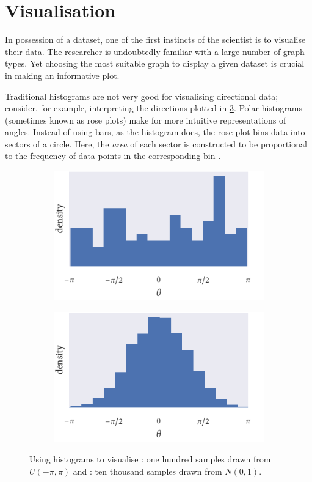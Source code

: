 \section{Visualisation}
\label{sec:circular_visualisation}

In possession of a dataset, one of the first instincts of the scientist is to visualise
their data. The researcher is undoubtedly familiar with a large number of graph types.
Yet choosing the most suitable graph to display a given dataset is crucial in making an
informative plot.

Traditional histograms are not very good for visualising directional data; consider, for
example, interpreting the directions plotted in \cref{fig:angle_hist}. Polar histograms
(sometimes known as rose plots) make for more intuitive representations of angles.
Instead of using bars, as the histogram does, the rose plot bins data into sectors of a
circle. Here, the \emph{area} of each sector is constructed to be proportional to the
frequency of data points in the corresponding bin \parencite{mardia09}.

\begin{figure}[tb]
	\begin{subfigure}[b]{0.5\textwidth}
		\includegraphics{unif_angle_hist.pdf}
		\caption{}
		\label{subfig:unif_angle_hist}
	\end{subfigure}%
	\begin{subfigure}[b]{0.5\textwidth}
		\includegraphics{norm_angle_hist.pdf}
		\caption{}
		\label{subfig:norm_angle_hist}
	\end{subfigure}
    \caption{Using histograms to visualise : one hundred
    samples drawn from $U(-\pi, \pi)$ and : ten thousand
    samples drawn from $N(0, 1)$.}
	\label{fig:angle_hist}
\end{figure}

